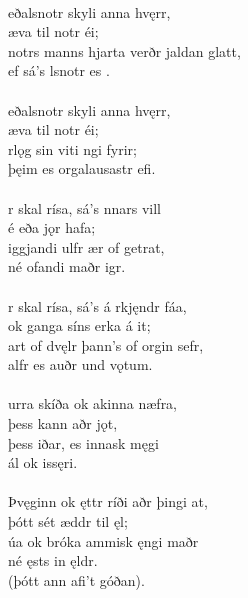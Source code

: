  \\

\bva {}eðalsnotr \hld skyli anna hvęrr, \\%
\ind æva til notr éi; \\%
notrs manns hjarta \hld verðr jaldan glatt, \\%
\ind ef sá's lsnotr es .\\%

 \\

\bva {}eðalsnotr \hld skyli anna hvęrr, \\%
\ind æva til notr éi; \\%
rlǫg sin \hld viti ngi fyrir; \\%
\ind þęim es orgalausastr efi.\\%

 \\

\bva {}r skal rísa, \hld sá's nnars vill \\%
\ind {}é eða jǫr hafa; \\%
iggjandi ulfr \hld {}ær of getrat, \\%
\ind né ofandi maðr igr.\\%

 \\

\bva {}r skal rísa, \hld sá's á rkjęndr fáa, \\%
\ind ok ganga síns erka á it; \\%
art of dvęlr \hld þann's of orgin sefr, \\%
\ind {}alfr es auðr und vǫtum.\\%

 \\

\bva {}urra skíða \hld ok akinna næfra, \\%
\ind þess kann aðr jǫt, \\%
þess iðar, \hld es innask męgi \\%
\ind {}ál ok issęri.\\%

 \\

\bva Þvęginn ok ęttr \hld ríði aðr þingi at, \\%
\ind þótt sét æddr til ęl; \\%
úa ok bróka \hld {}ammisk ęngi maðr \\%
\ind né ęsts in ęldr. \\%
\ind (þótt ann afi't góðan).\\%

